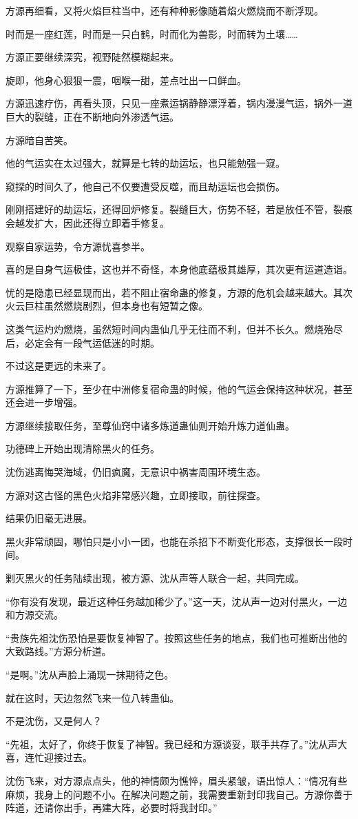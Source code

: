 \begin{this_body}
方源再细看，又将火焰巨柱当中，还有种种影像随着焰火燃烧而不断浮现。

时而是一座红莲，时而是一只白鹤，时而化为兽影，时而转为土壤……

方源正要继续深究，视野陡然模糊起来。

旋即，他身心狠狠一震，咽喉一甜，差点吐出一口鲜血。

方源迅速疗伤，再看头顶，只见一座煮运锅静静漂浮着，锅内漫漫气运，锅外一道巨大的裂缝，正在不断地向外渗透气运。

方源暗自苦笑。

他的气运实在太过强大，就算是七转的劫运坛，也只能勉强一窥。

窥探的时间久了，他自己不仅要遭受反噬，而且劫运坛也会损伤。

刚刚搭建好的劫运坛，还得回炉修复。裂缝巨大，伤势不轻，若是放任不管，裂痕会越发扩大，因此还得立即着手修复。

观察自家运势，令方源忧喜参半。

喜的是自身气运极佳，这也并不奇怪，本身他底蕴极其雄厚，其次更有运道造诣。

忧的是隐患已经显现而出，若不阻止宿命蛊的修复，方源的危机会越来越大。其次火云巨柱虽然燃烧剧烈，但本身也有短暂之像。

这类气运灼灼燃烧，虽然短时间内蛊仙几乎无往而不利，但并不长久。燃烧殆尽后，必定会有一段气运低迷的时期。

不过这是更远的未来了。

方源推算了一下，至少在中洲修复宿命蛊的时候，他的气运会保持这种状况，甚至还会进一步增强。

方源继续接取任务，至尊仙窍中诸多炼道蛊仙则开始升炼力道仙蛊。

功德碑上开始出现清除黑火的任务。

沈伤逃离悔哭海域，仍旧疯魔，无意识中祸害周围环境生态。

方源对这古怪的黑色火焰非常感兴趣，立即接取，前往探查。

结果仍旧毫无进展。

黑火非常顽固，哪怕只是小小一团，也能在杀招下不断变化形态，支撑很长一段时间。

剿灭黑火的任务陆续出现，被方源、沈从声等人联合一起，共同完成。

“你有没有发现，最近这种任务越加稀少了。”这一天，沈从声一边对付黑火，一边和方源交流。

“贵族先祖沈伤恐怕是要恢复神智了。按照这些任务的地点，我们也可推断出他的大致路线。”方源分析道。

“是啊。”沈从声脸上涌现一抹期待之色。

就在这时，天边忽然飞来一位八转蛊仙。

不是沈伤，又是何人？

“先祖，太好了，你终于恢复了神智。我已经和方源谈妥，联手共存了。”沈从声大喜，连忙迎接过去。

沈伤飞来，对方源点点头，他的神情颇为憔悴，眉头紧皱，语出惊人：“情况有些麻烦，我身上的问题不小。在解决问题之前，我需要重新封印我自己。方源你善于阵道，还请你出手，再建大阵，必要时将我封印。”

\end{this_body}

